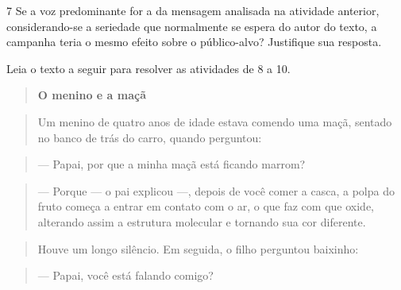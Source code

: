 
\num{7} Se a voz predominante for a da mensagem analisada na atividade
anterior, considerando-se a seriedade que normalmente se espera do autor
do texto, a campanha teria o mesmo efeito sobre o público-alvo?
Justifique sua resposta.


Leia o texto a seguir para resolver as atividades de 8 a 10.

\begin{quote}
\centering\textbf{O menino e a maçã}
\end{quote}


\begin{quote}
Um menino de quatro anos de idade estava comendo uma maçã, sentado no
banco de trás do carro, quando perguntou:
\end{quote}

\begin{quote}
--- Papai, por que a minha maçã está ficando marrom?
\end{quote}

\begin{quote}
--- Porque --- o pai explicou ---, depois de você comer a casca, a polpa
do fruto começa a entrar em contato com o ar, o que faz com que oxide,
alterando assim a estrutura molecular e tornando sua cor diferente.
\end{quote}

\begin{quote}
Houve um longo silêncio. Em seguida, o filho perguntou baixinho:
\end{quote}

\begin{quote}
--- Papai, você está falando comigo?
\end{quote}


